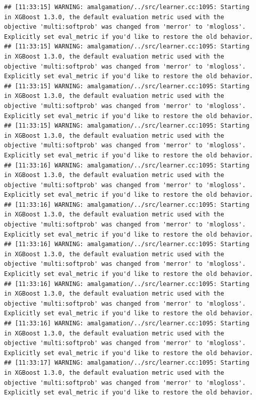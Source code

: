 \documentclass[
]{scrbook}
\begin{document}
\begin{verbatim}
## [11:33:15] WARNING: amalgamation/../src/learner.cc:1095: Starting in XGBoost 1.3.0, the default evaluation metric used with the objective 'multi:softprob' was changed from 'merror' to 'mlogloss'. Explicitly set eval_metric if you'd like to restore the old behavior.
## [11:33:15] WARNING: amalgamation/../src/learner.cc:1095: Starting in XGBoost 1.3.0, the default evaluation metric used with the objective 'multi:softprob' was changed from 'merror' to 'mlogloss'. Explicitly set eval_metric if you'd like to restore the old behavior.
## [11:33:15] WARNING: amalgamation/../src/learner.cc:1095: Starting in XGBoost 1.3.0, the default evaluation metric used with the objective 'multi:softprob' was changed from 'merror' to 'mlogloss'. Explicitly set eval_metric if you'd like to restore the old behavior.
## [11:33:15] WARNING: amalgamation/../src/learner.cc:1095: Starting in XGBoost 1.3.0, the default evaluation metric used with the objective 'multi:softprob' was changed from 'merror' to 'mlogloss'. Explicitly set eval_metric if you'd like to restore the old behavior.
## [11:33:16] WARNING: amalgamation/../src/learner.cc:1095: Starting in XGBoost 1.3.0, the default evaluation metric used with the objective 'multi:softprob' was changed from 'merror' to 'mlogloss'. Explicitly set eval_metric if you'd like to restore the old behavior.
## [11:33:16] WARNING: amalgamation/../src/learner.cc:1095: Starting in XGBoost 1.3.0, the default evaluation metric used with the objective 'multi:softprob' was changed from 'merror' to 'mlogloss'. Explicitly set eval_metric if you'd like to restore the old behavior.
## [11:33:16] WARNING: amalgamation/../src/learner.cc:1095: Starting in XGBoost 1.3.0, the default evaluation metric used with the objective 'multi:softprob' was changed from 'merror' to 'mlogloss'. Explicitly set eval_metric if you'd like to restore the old behavior.
## [11:33:16] WARNING: amalgamation/../src/learner.cc:1095: Starting in XGBoost 1.3.0, the default evaluation metric used with the objective 'multi:softprob' was changed from 'merror' to 'mlogloss'. Explicitly set eval_metric if you'd like to restore the old behavior.
## [11:33:16] WARNING: amalgamation/../src/learner.cc:1095: Starting in XGBoost 1.3.0, the default evaluation metric used with the objective 'multi:softprob' was changed from 'merror' to 'mlogloss'. Explicitly set eval_metric if you'd like to restore the old behavior.
## [11:33:17] WARNING: amalgamation/../src/learner.cc:1095: Starting in XGBoost 1.3.0, the default evaluation metric used with the objective 'multi:softprob' was changed from 'merror' to 'mlogloss'. Explicitly set eval_metric if you'd like to restore the old behavior.

\end{verbatim}
\end{document}
